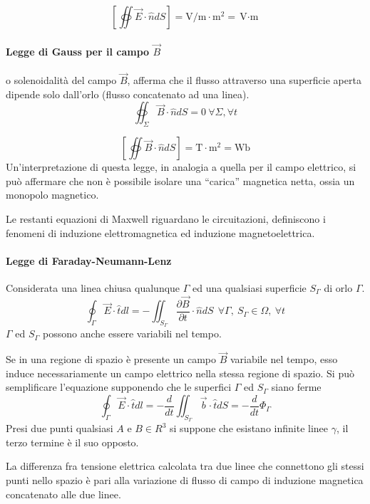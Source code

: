 $$
\left[\oiint \vec{E}\cdot\hat{n}dS\right] = \si{\volt\per\meter\cdot\meter^2} = \si{\volt\cdot\meter}
$$

\paragraph{Legge di Gauss per il campo $\vec{B}$} o solenoidalità del campo $\vec{B}$,
afferma che il flusso attraverso una superficie aperta dipende solo dall'orlo (flusso concatenato ad una
linea).
\begin{equation}
\oiint_{\Sigma} \vec{B}\cdot\hat{n}dS = 0\ \forall \Sigma, \forall t
\end{equation}

$$
\left[\oiint \vec{B}\cdot\hat{n}dS\right] = \si{\tesla\cdot\meter^2} = \si{\weber}
$$
Un'interpretazione di questa legge, in analogia a quella per il campo elettrico, si può affermare
che non è possibile isolare una ``carica'' magnetica netta, ossia un monopolo magnetico.

Le restanti equazioni di Maxwell riguardano le circuitazioni, definiscono i fenomeni di induzione
elettromagnetica ed induzione magnetoelettrica.

\paragraph{Legge di Faraday-Neumann-Lenz}
Considerata una linea chiusa qualunque $\Gamma$ ed una qualsiasi superficie $S_\Gamma$ di
orlo $\Gamma$.
\begin{equation}
\oint_{\Gamma} \vec{E}\cdot\hat{t}dl = - \iint_{S_\Gamma} \frac{\partial \vec{B}}{\partial t}
\cdot\hat{n} dS\ \ \forall\Gamma,\ S_\Gamma\in\Omega,\ \forall t
\end{equation}
$\Gamma$ ed $S_\Gamma$ possono anche essere variabili nel tempo.

Se in una regione di spazio è presente un campo $\vec{B}$ variabile nel tempo, esso induce necessariamente
un campo elettrico nella stessa regione di spazio.
Si può semplificare l'equazione supponendo che le superfici $\Gamma$ ed $S_\Gamma$ siano ferme
$$
\oint_{\Gamma} \vec{E}\cdot\hat{t}dl = -\frac{d}{dt} \iint_{S_\Gamma}\vec{b}\cdot\hat{t}dS = 
-\frac{d}{dt} \Phi_\Gamma
$$
Presi due punti qualsiasi $A$ e $B \in R^3$ si suppone che esistano infinite linee $\gamma$, il terzo 
termine è il suo opposto.

La differenza fra tensione elettrica calcolata tra due linee che connettono gli stessi punti nello 
spazio è pari alla variazione di flusso di campo di induzione magnetica concatenato alle due linee.

